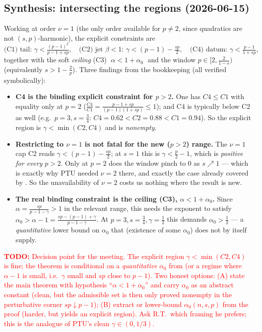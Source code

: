 \documentclass[11pt]{amsart}
\theoremstyle{plain}
\theoremstyle{definition}
\theoremstyle{remark}
\newcommand{\al}{\alpha}
\newcommand{\TODO}[1]{\textcolor{red}{\textbf{TODO:} #1}}
\begin{document}
\subsection*{Synthesis: intersecting the regions (2026-06-15)}
Working at order $\nu=1$ (the only order available for $p\neq2$, since
quadratics are not $(s,p)$-harmonic), the explicit constraints are
\[
  \text{(C1) tail: }\gamma<\tfrac{(p-1)^2}{p-1+sp},\quad
  \text{(C2) jet }\beta<1\text{: }\gamma<(p-1)-\tfrac{sp}{2},\quad
  \text{(C4) datum: }\gamma<\tfrac{p-1}{1+sp},
\]
together with the soft \emph{ceiling} (C3) $\;\al<1+\al_0\;$ and the
\cite{GJS} window $p\in[2,\tfrac{2}{1-s})$ (equivalently $s>1-\tfrac2p$).
Three findings from the bookkeeping (all verified symbolically):
\begin{itemize}
\item[(i)] \textbf{C4 is the binding explicit constraint for $p>2$.} One
  has $C4\le C1$ with equality only at $p=2$
  ($\frac{C4}{C1}=\frac{p-1+sp}{(p-1)(1+sp)}\le1$); and C4 is typically
  below C2 as well (e.g.\ $p=3,s=\tfrac34$: $C4=0.62<C2=0.88<C1=0.94$).
  So the explicit region is $\gamma<\min(C2,C4)$ and is \emph{nonempty}.
\item[(ii)] \textbf{Restricting to $\nu=1$ is not fatal for the new
  ($p>2$) range.} The $\nu=1$ cap C2 reads $\gamma<(p-1)-\tfrac{sp}{2}$;
  at $s=1$ this is $\gamma<\tfrac p2-1$, which is \emph{positive for every
  $p>2$}. Only at $p=2$ does the window pinch to $0$ as $s\nearrow1$ ---
  which is exactly why PTU needed $\nu=2$ there, and exactly the case
  already covered by \cite{PTU}. So the unavailability of $\nu=2$ costs us
  nothing where the result is new.
\item[(iii)] \textbf{The real binding constraint is the ceiling (C3),
  $\al<1+\al_0$.} Since $\al=\frac{sp}{p-1-\gamma}>1$ in the relevant
  range, this needs the \cite{GJS} exponent to satisfy
  $\al_0>\al-1=\frac{sp-(p-1)+\gamma}{p-1-\gamma}$. At $p=3,s=\tfrac34,
  \gamma=\tfrac12$ this demands $\al_0>\tfrac12$ --- a \emph{quantitative}
  lower bound on $\al_0$ that \cite{GJS} (existence of some $\al_0$) does
  not by itself supply.
\end{itemize}
\TODO{Decision point for the meeting. The explicit region
$\gamma<\min(C2,C4)$ is fine; the theorem is conditional on a
\emph{quantitative} $\al_0$ from \cite{GJS} (or a regime where $\al-1$ is
small, i.e.\ $\gamma$ small and $sp$ close to $p-1$). Two honest options:
(A) state the main theorem with hypothesis ``$\al<1+\al_0$'' and carry
$\al_0$ as an abstract constant (clean, but the admissible set is then
only proved nonempty in the perturbative corner $sp\downarrow p-1$);
(B) extract or lower-bound $\al_0(n,s,p)$ from the \cite{GJS} proof
(harder, but yields an explicit region). Ask R.T.\ which framing he
prefers; this is the analogue of PTU's clean $\gamma\in(0,1/3)$.}
\end{document}
